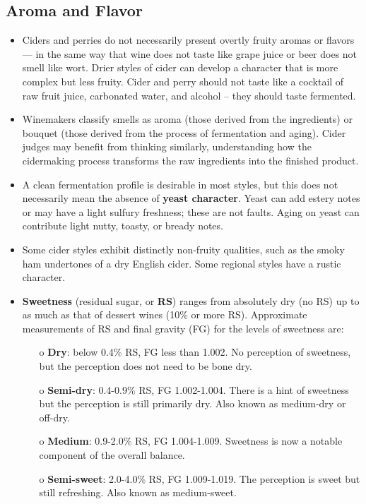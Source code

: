\subsection*{Aroma and Flavor}

\begin{itemize}
\item Ciders and perries do not necessarily present overtly fruity aromas or flavors — in the same way that wine does not taste like grape juice or beer does not smell like wort. Drier styles of cider can develop a character that is more complex but less fruity. Cider and perry should not taste like a cocktail of raw fruit juice, carbonated water, and alcohol – they should taste fermented.
\item Winemakers classify smells as aroma (those derived from the ingredients) or bouquet (those derived from the process of fermentation and aging). Cider judges may benefit from thinking similarly, understanding how the cidermaking process transforms the raw ingredients into the finished product.
\item A clean fermentation profile is desirable in most styles, but this does not necessarily mean the absence of \textbf{yeast character}. Yeast can add estery notes or may have a light sulfury freshness; these are not faults. Aging on yeast can contribute light nutty, toasty, or bready notes.
\item Some cider styles exhibit distinctly non-fruity qualities, such as the smoky ham undertones of a dry English cider. Some regional styles have a rustic character.
\item \textbf{Sweetness} (residual sugar, or \textbf{RS}) ranges from absolutely dry (no RS) up to as much as that of dessert wines (10\% or more RS). Approximate measurements of RS and final gravity (FG) for the levels of sweetness are:
  \begin{itemize}
  \item[o] \textbf{Dry}: below 0.4\% RS, FG less than 1.002. No perception of sweetness, but the perception does not need to be bone dry.
  \item[o] \textbf{Semi-dry}: 0.4-0.9\% RS, FG 1.002-1.004. There is a hint of sweetness but the perception is still primarily dry. Also known as medium-dry or off-dry.
  \item[o] \textbf{Medium}: 0.9-2.0\% RS, FG 1.004-1.009. Sweetness is now a notable component of the overall balance.
  \item[o] \textbf{Semi-sweet}: 2.0-4.0\% RS, FG 1.009-1.019. The perception is sweet but still refreshing. Also known as medium-sweet.

\end{itemize}
\end{itemize}
